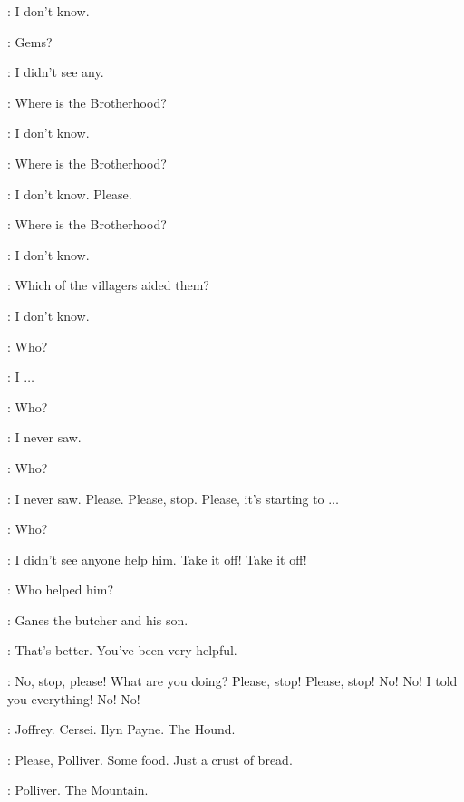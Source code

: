 \PRISONER: I don't know. 

\TICKLER: Gems? 

\PRISONER: I didn't see any. 

\TICKLER: Where is the Brotherhood? 

\TICKLER: I don't know. 


\TICKLER: Where is the Brotherhood? 

\PRISONER: I don't know. Please. 

\TICKLER: Where is the Brotherhood? 

\PRISONER: I don't know. 

\TICKLER: Which of the villagers aided them? 

\PRISONER: I don't know. 

\TICKLER: Who? 


\PRISONER: I $\ldots$  

\TICKLER: Who? 

\PRISONER: I never saw. 

\TICKLER: Who? 

\PRISONER: I never saw. Please. Please, stop. Please, it's starting to $\ldots$  

\TICKLER: Who? 

\PRISONER: I didn't see anyone help him. Take it off! Take it off! 

\TICKLER: Who helped him? 

\PRISONER: Ganes the butcher and his son.

\TICKLER: That's better. You've been very helpful. 


\PRISONER: No, stop, please! What are you doing? Please, stop! Please, stop! No! No! I told you everything! No! No! 


\ARYA: Joffrey. Cersei. Ilyn Payne. The Hound. 

\PEASANTWOMAN:  Please, Polliver. Some food. Just a crust of bread. 


\ARYA: Polliver. The Mountain. 

